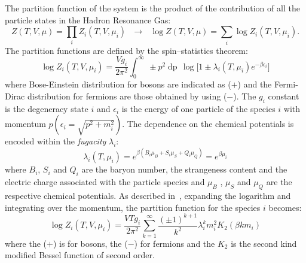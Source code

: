 The partition function of the system is the product of the contribution of all the particle states
in the Hadron Resonance Gas:
\begin{equation} \label{eq:partfuncprod}
    Z(T,V,\mu) = \prod_{i} Z_{i}(T,V,\mu_{i}) \ \ \ \rightarrow \ \ \ 
    \log Z(T,V,\mu) = \sum_{i} \log Z_{i}(T,V,\mu_{i}).
\end{equation}
The partition functions are defined by the spin–statistics theorem:
\begin{equation} \label{eq:partfuncspin}
    \log Z_{i}(T,V,\mu_{i}) = \frac{V g_{i}}{2 \pi^{2}} \int_{0}^{\infty}\
     \pm p^{2} \mathop{dp} \, \log \Big[1\pm \lambda_{i}(T,\mu_{i})e^{- \beta \epsilon_{i}} \Big]
\end{equation}
where Bose-Einstein distribution for bosons are indicated as ($+$) and the Fermi-Dirac distribution
for fermions are those obtained by using ($-$).
The $g_{i}$ constant is the degeneracy state $i$ and $\epsilon_{i}$ is the energy of one 
particle of the species $i$ with momentum $p (\epsilon_{i} = \sqrt{p^{2} + m_{i}^{2}})$.
The dependence on the chemical potentials is encoded within the \textit{fugacity}
$\lambda_{i}$:
\begin{equation} \label{eq:fugacity}
    \lambda_{i}(T,\mu_{i}) = e^{\beta(B_{i}\mu_{B} + S_{i}\mu_{S} + Q_{i}\mu_{Q})}
    = e^{\beta \mu_{i}}
\end{equation}
where $B_{i}$, $S_{i}$ and $Q_{i}$ are the baryon number, the strangeness content and the electric
charge associated with the particle species and $\mu_{B}$ , $\mu_{S}$ and $\mu_{Q}$ are the 
respective chemical potentials. As described in~\cite{pbmstat}, expanding the logarithm and
integrating over the momentum, the partition function for the species $i$ becomes:
\begin{equation}
    \log Z_{i}(T,V,\mu_{i}) = \frac{V T g_{i}}{2 \pi^{2}}
    \sum_{k=1}^{\infty} \frac{(\pm 1)^{k+1}}{k^{2}} \lambda^{k}_{i} m_{i}^{2} K_{2}(\beta k m_{i})
\end{equation}
where the ($+$) is for bosons, the ($-$) for fermions and the $K_{2}$ is the second 
kind modified Bessel function of second order.

